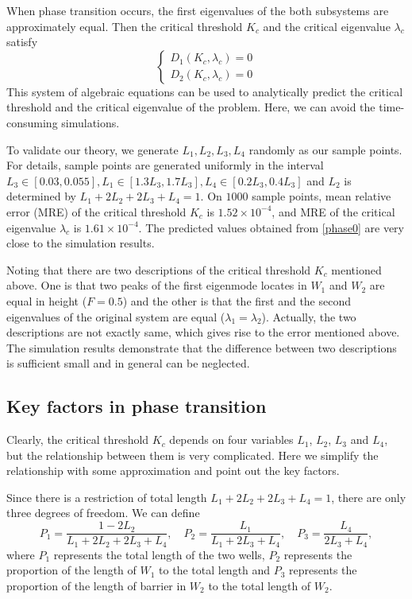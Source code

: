 \documentclass[a4paper,11pt]{article}
\begin{document}
When phase transition occurs, the first eigenvalues of the both subsystems are approximately equal. Then the critical threshold $K_c$ and the critical eigenvalue $\lambda_c$ satisfy
\begin{equation}\label{phase0}
\left\{
\begin{split}
D_1(K_c, \lambda_c) = 0 \\
D_2(K_c, \lambda_c) = 0
\end{split}
\right.
\end{equation}
This system of algebraic equations can be used to analytically predict the critical threshold and the critical eigenvalue of the problem. Here, we can avoid the time-consuming simulations.

To validate our theory, we generate $L_1, L_2, L_3, L_4$ randomly as our sample points. For details, sample points are generated uniformly in the interval $L_3 \in [0.03, 0.055], L_1 \in [1.3 L_3, 1.7 L_3], L_4 \in [0.2 L_3, 0.4 L_3]$ and $L_2$ is determined by $L_1 + 2 L_2 + 2 L_3 + L_4 = 1$. On $1000$ sample points, mean relative error (MRE) of the critical threshold $K_c$ is $1.52 \times 10^{-4}$, and MRE of the critical eigenvalue $\lambda_c$ is $1.61 \times 10^{-4}$. The predicted values obtained from \eqref{phase0} are very close to the simulation results.

Noting that there are two descriptions of the critical threshold $K_c$ mentioned above. One is that two peaks of the first eigenmode locates in $W_1$ and $W_2$ are equal in height ($F = 0.5$) and the other is that the first and the second eigenvalues of the original system are equal ($\lambda_1 = \lambda_2$). Actually, the two descriptions are not exactly same, which gives rise to the error mentioned above. The simulation results demonstrate that the difference between two descriptions is sufficient small and in general can be neglected.

\subsection{Key factors in phase transition}

Clearly, the critical threshold $K_c$ depends on four variables $L_1$, $L_2$, $L_3$ and $L_4$, but the relationship between them is very complicated. Here we simplify the relationship with some approximation and point out the key factors. 

Since there is a restriction of total length $L_1 + 2 L_2 + 2 L_3 + L_4 = 1$, there are only three degrees of freedom. We can define 
\begin{equation}
P_1 = \frac{1 - 2 L_2}{L_1 + 2 L_2 + 2 L_3 + L_4}, \quad P_2 = \frac{L_1}{L_1 + 2 L_3 + L_4}, \quad P_3 = \frac{L_4}{2 L_3 + L_4},
\end{equation}
where $P_1$ represents the total length of the two wells, $P_2$ represents the proportion of the length of $W_1$ to the total length and $P_3$ represents the proportion of the length of barrier in $W_2$ to the total length of $W_2$.
\end{document}
